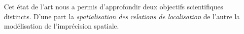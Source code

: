 Cet état de l'art nous a permis d'approfondir deux objectifs
scientifiques distincts. D'une part la \emph{spatialisation des
  relations de localisation} de l'autre la modélisation de
l'imprécision spatiale.

